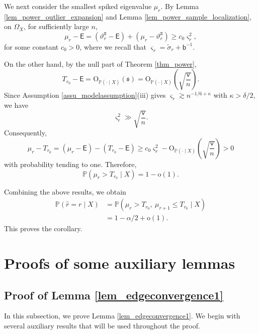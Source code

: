 \documentclass[12pt]{article}
\theoremstyle{plain}
\numberwithin{equation}{section}
\begin{document}
We next consider the smallest spiked eigenvalue $\mu_r$. By Lemma \ref{lem_power_outlier_expansion} and Lemma \ref{lem_power_sample_localization}, on $\Omega_X$, for sufficiently large $n$,
\[
\mu_r-\mathsf E
=
(\vartheta_r^{\mathtt S}-\mathsf E)+(\mu_r-\vartheta_r^{\mathtt S})
\ge c_0\varsigma_r^2,
\]
for some constant $c_0>0$, where we recall that $\varsigma_r=\widetilde\sigma_r+\mathsf b^{-1}.$

On the other hand, by the null part of Theorem \ref{thm_power},
\[
T_{r_0}-\mathsf E
=
\mathrm O_{\mathbb P(\cdot\mid X)}(\mathfrak s)
=
\mathrm O_{\mathbb P(\cdot\mid X)}\!\left(\sqrt{\frac{\mathsf v}{n}}\right).
\]
Since Assumption \ref{assu_modelassumption}(iii) gives $\varsigma_r\gtrsim n^{-1/6+\kappa}$ with $\kappa>\delta/2$, we have
\[
\varsigma_r^2\gg \sqrt{\frac{\mathsf v}{n}}.
\]
Consequently,
\[
\mu_r-T_{r_0}
=
(\mu_r-\mathsf E)-(T_{r_0}-\mathsf E)
\ge
c_0\varsigma_r^2-\mathrm O_{\mathbb P(\cdot\mid X)}\!\left(\sqrt{\frac{\mathsf v}{n}}\right)
>
0
\]
with probability tending to one. Therefore,
\[
\mathbb P(\mu_r>T_{r_0}\mid X)=1-\mathrm o(1).
\]

Combining the above results, we obtain
\begin{align*}
	\mathbb P(\widehat r=r\mid X)
	&=
	\mathbb P(\mu_r>T_{r_0},\ \mu_{r+1}\le T_{r_0}\mid X)\\
	&=
	1-\alpha/2+\mathrm o(1).
\end{align*}
This proves the corollary.



\section{Proofs of some auxiliary lemmas}

\subsection{Proof of Lemma \ref{lem_edgeconvergence1}}\label{sec_prf_lem_edgeconvergence1}
In this subsection, we prove Lemma \ref{lem_edgeconvergence1}. We begin with several auxiliary results that will be used throughout the proof.
\end{document}
